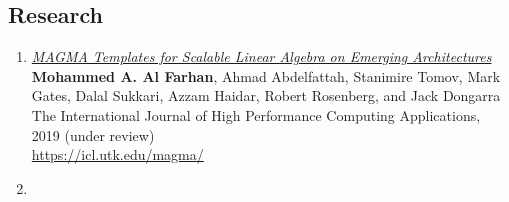 \documentclass[margin]{resume2}
\begin{document}
\begin{resume}
    \section{Research}
      \begin{enumerate}[leftmargin=*]
      \item
       {\it \href{}
       {MAGMA Templates for Scalable Linear Algebra on Emerging Architectures
       }}\\
       {\bf Mohammed A. Al Farhan}, Ahmad Abdelfattah, Stanimire Tomov, Mark Gates, Dalal Sukkari, Azzam Haidar, Robert Rosenberg, and Jack Dongarra\\
       The International Journal of High Performance Computing Applications, 2019 (under review)\\
      \url{https://icl.utk.edu/magma/}
        \item

\end{enumerate}
\end{resume}
\end{document}
